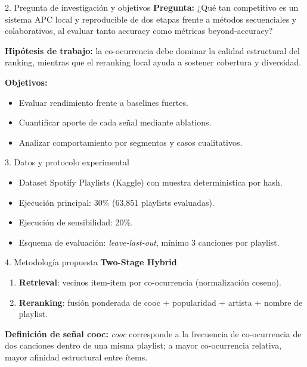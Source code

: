 ﻿\documentclass[final]{beamer}
\newlength{\colwidth}
\begin{document}
\begin{frame}[t]
\begin{columns}[t]
\begin{column}{\colwidth}
\begin{alertblock}{2. Pregunta de investigación y objetivos}
\textbf{Pregunta:} ¿Qué tan competitivo es un sistema APC local y reproducible de dos etapas frente a métodos secuenciales y colaborativos, al evaluar tanto accuracy como métricas beyond-accuracy?

\vspace{0.15cm}
\textbf{Hipótesis de trabajo:} la co-ocurrencia debe dominar la calidad estructural del ranking, mientras que el reranking local ayuda a sostener cobertura y diversidad.

\vspace{0.25cm}
\textbf{Objetivos:}
\begin{itemize}
  \item Evaluar rendimiento frente a baselines fuertes.
  \item Cuantificar aporte de cada señal mediante ablations.
  \item Analizar comportamiento por segmentos y casos cualitativos.
\end{itemize}
\end{alertblock}

\begin{block}{3. Datos y protocolo experimental}
\begin{itemize}
  \item Dataset Spotify Playlists (Kaggle) con muestra deterministica por hash.
  \item Ejecución principal: 30\% (63,851 playlists evaluadas).
  \item Ejecución de sensibilidad: 20\%.
  \item Esquema de evaluación: \textit{leave-last-out}, mínimo 3 canciones por playlist.
\end{itemize}
\end{block}

\begin{block}{4. Metodología propuesta}
\textbf{Two-Stage Hybrid}
\begin{enumerate}
  \item \textbf{Retrieval}: vecinos item-item por co-ocurrencia (normalización coseno).
  \item \textbf{Reranking}: fusión ponderada de cooc + popularidad + artista + nombre de playlist.
\end{enumerate}

\textbf{Definición de señal cooc:} \textit{cooc} corresponde a la frecuencia de co-ocurrencia de dos canciones dentro de una misma playlist; a mayor co-ocurrencia relativa, mayor afinidad estructural entre ítems.


\end{block}
\end{column}
\end{columns}
\end{frame}
\end{document}
